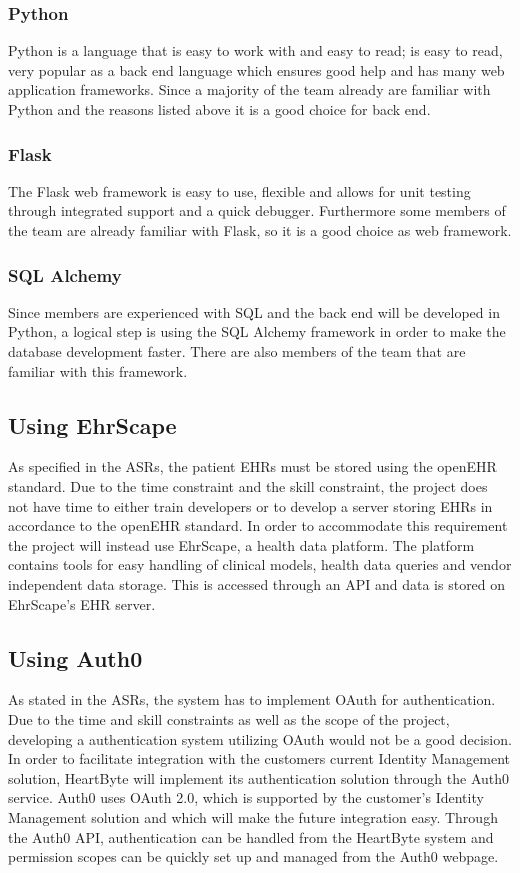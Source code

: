 \documentclass{article}
\begin{document}
\subsubsection{Python}
Python is a language that is easy to work with and easy to read; is easy to read, very popular as a back end language which ensures good help and has many web application frameworks. Since a majority of the team already are familiar with Python and the reasons listed above it is a good choice for back end. 
\subsubsection{Flask}
The Flask web framework is easy to use, flexible and allows for unit testing through integrated support and a quick debugger. Furthermore some members of the team are already familiar with Flask, so it is a good choice as web framework.
\subsubsection{SQL Alchemy}
Since members are experienced with SQL and the back end will be developed in Python, a logical step is using the SQL Alchemy framework in order to make the database development faster. There are also members of the team that are familiar with this framework.

\subsection{Using EhrScape}
As specified in the ASRs, the patient EHRs must be stored using the openEHR standard. Due to the time constraint and the skill constraint, the project does not have time to either train developers or to develop a server storing EHRs in accordance to the openEHR standard. In order to accommodate this requirement the project will instead use EhrScape, a health data platform. The platform contains tools for easy handling of clinical models, health data queries and vendor independent data storage. This is accessed through an API and data is stored on EhrScape's EHR server.

\subsection{Using Auth0}
As stated in the ASRs, the system has to implement OAuth for authentication. Due to the time and skill constraints as well as the scope of the project, developing a authentication system utilizing OAuth would not be a good decision. In order to facilitate integration with the customers current Identity Management solution, HeartByte will implement its authentication solution through the Auth0 service. Auth0 uses OAuth 2.0, which is supported by the customer's Identity Management solution and which will make the future integration easy. Through the Auth0 API, authentication can be handled from the HeartByte system and permission scopes can be quickly set up and managed from the Auth0 webpage.
\end{document}
